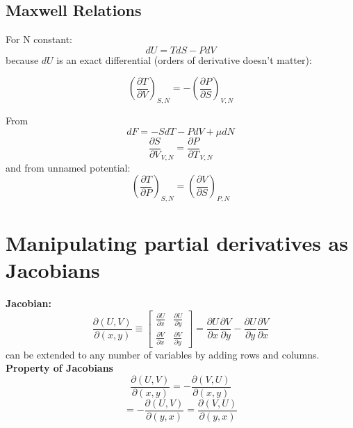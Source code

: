 \documentclass[11pt]{book}
\theoremstyle{definition}
\begin{document}
\subsection{Maxwell Relations}
For N constant:
\[ dU = TdS - PdV \] 
because $ dU $ is an exact differential (orders of derivative doesn't matter):
\begin{shaded*}
	\[ \left (\frac{\partial T}{\partial V} \right ) _{S,N} = - \left( \frac{\partial P}{\partial S} \right)_{V,N} \] 
\end{shaded*}

From \[ dF = -SdT - PdV + \mu dN \] 
\[ \frac{\partial S}{\partial V}_{V,N} = \frac{\partial P}{\partial T}_{V,N} \] 
and from unnamed potential:
\[ \left( \frac{\partial T}{\partial P} \right)_{S,N} = \left( \frac{\partial V}{\partial S} \right )_{P,N} \] 

\section{Manipulating partial derivatives as Jacobians}
\textbf{Jacobian:} 
\begin{equation}
	\frac{\partial (U,V)}{\partial (x,y)} \equiv \begin{bmatrix}
	\frac{\partial U}{\partial x} & \frac{\partial U}{\partial y}  \\
	\frac{\partial V}{\partial x}& \frac{\partial V}{\partial y} 
	\end{bmatrix} 	
	= \frac{\partial U}{\partial x} \frac{\partial V}{\partial y} - \frac{\partial U}{\partial y} \frac{\partial V}{\partial x}
\end{equation}
can be extended to any number of variables by adding rows and columns. \\
\textbf{Property of Jacobians} 
\[ \frac{\partial (U,V)}{\partial (x,y)} = - \frac{\partial (V,U)}{\partial (x,y)}\] 
\[ = - \frac{\partial (U,V)}{\partial (y,x)} = \frac{\partial (V,U)}{\partial (y,x)} \] 
\end{document}
